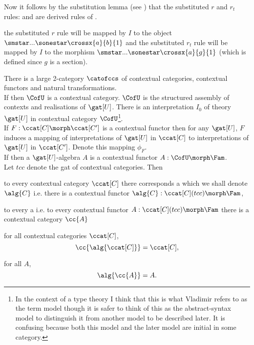 \begin{tightquote}
\begin{oldtt}
Now it follows by the substitution lemma (see \cite{Cartmell86})
that the substituted $r$ and $r_t$ rules: 
and   are derived rules of \gatU. 

the substituted $r$ rule will be mapped by $I$ to the object $\smstar...\sonestar\crossx{a}{b}{1}$ and the substituted $r_t$ rule will
be mapped by $I$ to the morphism  $\smstar...\sonestar\crossx{a}{g}{1}$ (which is defined since $g$ is a section).
\end{oldtt}

\begin{oldtt}

\note There is a large 2-category $\catofccs$ of contextual categories, contextual functors and natural transformations. \\

\note
If \isagat[U] then $\CofU$ is a contextual category. 
$\CofU$ is the structured assembly of contexts and realisations of $\gat[U]$.
There is an interpretation $I_0$ of theory $\gat[U]$ in contextual category
$\CofU$\footnote{
In the context of a type theory I think that this is what Vladimir refers to as the term model though it is safer to think of this as the abstract-syntax model to distinguish it from another model to be described later. It is confusing because both this model and the later model are initial in some category.}.\\

\note If $F : \ccat[C] \morph \ccat[C']$ is a contextual functor then for any $\gat[U]$, 
$F$ induces a mapping of interpretations of $\gat[U]$ in $\ccat[C]$ to interpretations of $\gat[U]$ in $\ccat[C']$. Denote this mapping $\phi_F$. \\

\note
If \isagat[U] then a $\gat[U]$-algebra $A$ is a contextual functor $A: \CofU \morph \Fam$. \\

\note 
Let $tcc$ denote the gat of contextual categories. Then
\begin{point}
to every contextual category $\ccat[C]$ there corresponds a \tccalgebra 
which we shall denote $\alg{C}$  i.e. there is a contextual functor $\alg{C} :\ccat[C](tcc) \morph \Fam$,
\end{point}
\begin{point}
to every a \tccalgebra i.e. to every contextual functor $A :\ccat[C](tcc) \morph \Fam$ there is a contextual category $\cc{A}$
\end{point}
\begin{point}
for all contextual categories $\ccat[C]$,
\begin{equation}
\cc{\alg{\ccat[C]}}= \ccat[C],
\end{equation}
\end{point}
\begin{point}
for all \tccalgebras $A$,
\begin{equation}
\alg{\cc{A}} = A.
\end{equation}
\end{point}


\end{oldtt}
\end{tightquote}

